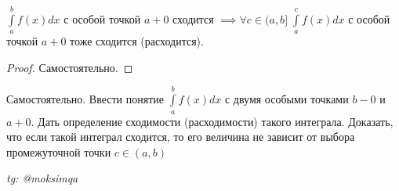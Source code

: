 \documentclass[../main.tex]{subfiles}
\begin{document}
\begin{theorem}
    $\int\limits_{a }^{b    } f(x)dx $ с особой точкой $a+0$ сходится $\implies \forall c\in(a,b] \;\int\limits_{a    }^{c    } f(x)dx$ с особой точкой $a+0$ тоже сходится (расходится). 

\end{theorem}
\begin{proof}
    Самостоятельно.
\end{proof}

Самостоятельно. Ввести понятие $\int\limits_{a  }^{b    } f(x)dx$ с двумя особыми точками $b-0$ и $a+0$. Дать определение сходимости (расходимости) такого интеграла. Доказать, что если такой интеграл сходится, то его величина не зависит от выбора промежуточной точки $c\in (a,b)$


\vspace{1cm}
\begin{flushright}
    \textit{tg: @moksimqa}
\end{flushright}
\end{document}
